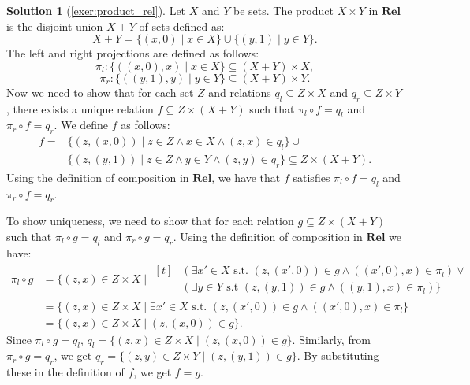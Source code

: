\documentclass[a4paper,11pt, oneside,titlepage=false]{scrbook}
\theoremstyle{plain}
\theoremstyle{definition}
\newtheorem{solution}[thm]{Solution}
\newcommand{\Catb}[1]{\mathbf{#1}}
\newcommand{\REL}{\Catb{Rel}}
\begin{document}
\begin{solution}[\cref{exer:product_rel}]\label{sol:product_rel}
	Let $X$ and $Y$ be sets. The product $X \times Y$ in $\REL$ is the disjoint union $X + Y$ of sets defined as:
	\[ X + Y = \{ (x,0) \mid x \in X \} \cup  \{ (y,1) \mid y \in Y \}. \]
	The left and right projections are defined as follows:
	\[ \pi_l : \{ ((x,0),x) \mid x \in X \} \subseteq (X + Y) \times X, \]
	\[ \pi_r : \{ ((y,1),y) \mid y \in Y \} \subseteq (X + Y) \times Y. \]
	Now we need to show that for each set $Z$ and relations $q_l \subseteq Z \times X$ and $q_r \subseteq Z \times Y$, there exists a unique relation $f \subseteq Z \times (X + Y)$ such that $\pi_l \circ f = q_l$ and $\pi_r \circ f = q_r$.
	We define $f$ as follows:
	\begin{align*}
		f = & \{ (z,(x,0)) \mid z \in Z \wedge x \in X \wedge (z,x) \in q_l \} \cup \\
			& \{ (z,(y,1)) \mid z \in Z \wedge y \in Y \wedge (z,y) \in q_r \} \subseteq Z \times (X + Y) .
	\end{align*}
	Using the definition of composition in $\REL$, we have that $f$ satisfies $\pi_l \circ f = q_l$ and $\pi_r \circ f = q_r$.

	To show uniqueness, we need to show that for each relation $g \subseteq Z \times (X + Y)$ such that $\pi_l \circ g = q_l$ and $\pi_r \circ g = q_r$.
	Using the definition of composition in $\REL$ we have:
	\begin{align*}
		\pi_l \circ g & = \{ (z,x) \in Z \times X \mid
		\begin{aligned}[t]
			& (\exists x' \in X \text{ s.t. } (z, (x',0)) \in g \wedge ((x',0),x) \in \pi_l) \vee \\
			& (\exists y \in Y \text{ s.t } (z,(y,1)) \in g \wedge ((y,1),x) \in \pi_l) \}
		\end{aligned} \\
		& = \{ (z,x) \in Z \times X \mid \exists x' \in X \text{ s.t. } (z, (x',0)) \in g \wedge ((x',0),x) \in \pi_l \} \\
		& = \{ (z,x) \in Z \times X \mid (z, (x,0)) \in g \}.
	\end{align*}
	Since $\pi_l \circ g = q_l$, $q_l = \{ (z,x) \in Z \times X \mid (z, (x,0)) \in g \}$. Similarly, from $\pi_r \circ g = q_r$, we get $q_r = \{ (z,y) \in Z \times Y \mid (z, (y,1)) \in g \}$. By substituting these in the definition of $f$, we get $f = g$.
\end{solution}
\end{document}
